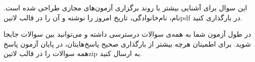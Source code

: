 
این سوال برای آشنایی بیشتر با روند برگزاری آزمون‌های مجازی طراحی شده است.
نام، نام‌خانوادگی، تاریخ امروز را نوشته و آن را در قالب
‌لاتین{pdf}
در
بارگذاری کنید.

در طول آزمون شما به همه‌ی سوالات درسترسی داشته و می‌توانید بین سوالات جابجا شوید.
برای اطمینان هرچه بیشتر از بارگذاری صحیح پاسخ‌هایتان، در پایان آزمون پاسخ همه سوالات را در قالب
‌لاتین{zip}
به
ارسال کنید.

